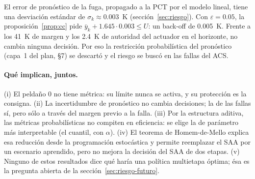 \begin{ejemplo}
El error de pronóstico de la fuga, propagado a la PCT por el modelo lineal, tiene una desviación
estándar de $\sigma_k\approx0.003$~K (sección~\ref{sec:riesgo}). Con $\varepsilon=0.05$, la
proposición~\ref{prop:cc} pide $\bar y_k+1.645\cdot0.003\le U$: un back-off de 0.005~K. Frente a
los 41~K de margen y los 2.4~K de autoridad del actuador en el horizonte, no cambia ninguna
decisión. Por eso la restricción probabilística del pronóstico (capa~1 del plan, §7) se descartó y
el riesgo se buscó en las fallas del ACS.
\end{ejemplo}

\paragraph{Qué implican, juntos.} (i) El peldaño 0 no tiene métrica: su límite nunca se activa,
y su protección es la consigna. (ii) La incertidumbre de pronóstico no cambia decisiones; la de
las fallas sí, pero sólo a través del margen previo a la falla. (iii) Por la estructura aditiva,
las métricas probabilísticas no compiten en eficiencia: se elige la de parámetro más
interpretable (el cuantil, con $\alpha$). (iv) El teorema de Homem-de-Mello explica esa reducción
desde la programación estocástica y permite reemplazar el SAA por un escenario aprendido, pero no
mejora la decisión del SAA de dos etapas. (v) Ninguno de estos resultados dice qué haría una
política multietapa óptima; ésa es la pregunta abierta de la sección~\ref{sec:riesgo-futuro}.
